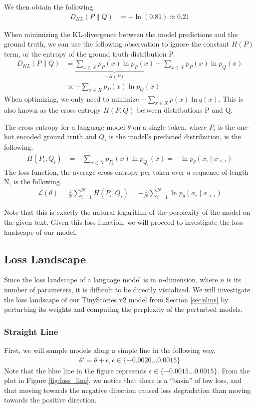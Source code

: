 \documentclass[../main.tex]{subfiles}
\begin{document}
We then obtain the following.
\begin{align}
D_{KL}(P \parallel Q) &= -\ln(0.81) \approx 0.21
\end{align}

When minimizing the KL-divergence between the model predictions and the ground truth, we can use the following observation to ignore the constant $H(P)$ term, or the entropy of the ground truth distribution P.
\begin{align}
    D_{KL}(P\parallel Q)&= \underbrace{\sum_{x\in X} p_P(x)\ln p_P(x)}_{-H(P)} - \sum_{x\in X} p_P(x)\ln p_Q(x)\\
    &\propto -\sum_{x\in X} p_P(x)\ln p_Q(x)
\end{align}
When optimizing, we only need to minimize $-\sum_{x\in X} p(x)\ln q(x)$. This is also known as the cross entropy $H(P, Q)$ between distributions P and Q.

The cross entropy for a language model $\theta$ on a single token, where $P_i$ is the one-hot encoded ground truth and $Q_i$ is the model's predicted distribution, is the following.
\begin{align}
    H(P_i,Q_i) &= -\sum_{x \in X} p_{P_i}(x)\ln p_{Q_i}(x) = - \ln p_\theta (x_i \mid x_{<i})
\end{align}
The loss function, the average cross-entropy per token over a sequence of length N, is the following.
\begin{align}
    \mathcal{L}(\theta) = \frac1N \sum_{i=1}^N H(P_i, Q_i) = -\frac1N \sum_{i=1}^N \ln p_\theta (x_i \mid x_{<i})
\end{align}

Note that this is exactly the natural logarithm of the perplexity of the model on the given text. Given this loss function, we will proceed to investigate the loss landscape of our model.

\subsection{Loss Landscape}
Since the loss landscape of a language model is in $n$-dimension, where $n$ is its number of parameters, it is difficult to be directly visualized. We will investigate the loss landscape of our TinyStories v2 model from Section \ref{sec:slms} by perturbing its weights and computing the perplexity of the perturbed models.

\subsubsection{Straight Line}
First, we will sample models along a simple line in the following way.
\begin{align}
    \theta' = \theta + \epsilon,  \epsilon \in \{-0.0020 \dots 0.0015\} 
\end{align}
Note that the blue line in the figure represents $\epsilon \in \{-0.0015 \dots 0.0015\}$. From the plot in Figure \ref{fig:loss_line}, we notice that there is a ``basin'' of low loss, and that moving towards the negative direction caused less degradation than moving towards the positive direction.
\end{document}
